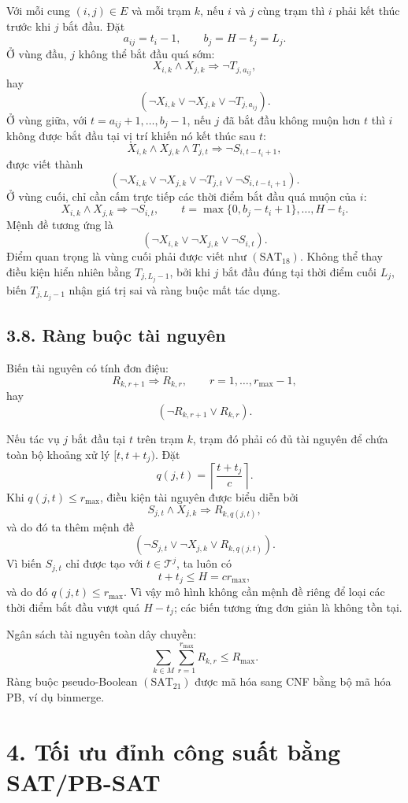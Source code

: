 \documentclass[12pt]{article}
\begin{document}
Với mỗi cung $(i,j)\in E$ và mỗi trạm $k$, nếu $i$ và $j$ cùng trạm thì $i$ phải kết thúc trước khi $j$ bắt đầu. Đặt
\[
a_{ij}=t_i-1,\qquad b_j=H-t_j=L_j.
\]
Ở vùng đầu, $j$ không thể bắt đầu quá sớm:
\[
X_{i,k}\land X_{j,k}\Rightarrow \neg T_{j,a_{ij}},
\]
hay
\[
(\neg X_{i,k}\lor \neg X_{j,k}\lor \neg T_{j,a_{ij}}).
\tag{SAT\_16}
\]
Ở vùng giữa, với $t=a_{ij}+1,\ldots,b_j-1$, nếu $j$ đã bắt đầu không muộn hơn $t$ thì $i$ không được bắt đầu tại vị trí khiến nó kết thúc sau $t$:
\[
X_{i,k}\land X_{j,k}\land T_{j,t}
\Rightarrow
\neg S_{i,t-t_i+1},
\]
được viết thành
\[
(\neg X_{i,k}\lor \neg X_{j,k}\lor \neg T_{j,t}\lor \neg S_{i,t-t_i+1}).
\tag{SAT\_17}
\]
Ở vùng cuối, chỉ cần cấm trực tiếp các thời điểm bắt đầu quá muộn của $i$:
\[
X_{i,k}\land X_{j,k}
\Rightarrow
\neg S_{i,t},
\qquad
t=\max\{0,b_j-t_i+1\},\ldots,H-t_i.
\]
Mệnh đề tương ứng là
\[
(\neg X_{i,k}\lor \neg X_{j,k}\lor \neg S_{i,t}).
\tag{SAT\_18}
\]
Điểm quan trọng là vùng cuối phải được viết như $(\mathrm{SAT}_{18})$. Không thể thay điều kiện hiển nhiên bằng $T_{j,L_j-1}$, bởi khi $j$ bắt đầu đúng tại thời điểm cuối $L_j$, biến $T_{j,L_j-1}$ nhận giá trị sai và ràng buộc mất tác dụng.

\subsection*{3.8. Ràng buộc tài nguyên}

Biến tài nguyên có tính đơn điệu:
\[
R_{k,r+1}\Rightarrow R_{k,r},
\qquad r=1,\ldots,r_{\max}-1,
\]
hay
\[
(\neg R_{k,r+1}\lor R_{k,r}).
\tag{SAT\_19}
\]

Nếu tác vụ $j$ bắt đầu tại $t$ trên trạm $k$, trạm đó phải có đủ tài nguyên để chứa toàn bộ khoảng xử lý $[t,t+t_j)$. Đặt
\[
q(j,t)=\left\lceil \frac{t+t_j}{c}\right\rceil.
\]
Khi $q(j,t)\le r_{\max}$, điều kiện tài nguyên được biểu diễn bởi
\[
S_{j,t}\land X_{j,k}\Rightarrow R_{k,q(j,t)},
\]
và do đó ta thêm mệnh đề
\[
(\neg S_{j,t}\lor \neg X_{j,k}\lor R_{k,q(j,t)}).
\tag{SAT\_20}
\]
Vì biến $S_{j,t}$ chỉ được tạo với $t\in\mathcal{T}^{j}$, ta luôn có
\[
t+t_j\le H=cr_{\max},
\]
và do đó $q(j,t)\le r_{\max}$. Vì vậy mô hình không cần mệnh đề riêng để loại các thời điểm bắt đầu vượt quá $H-t_j$; các biến tương ứng đơn giản là không tồn tại.

Ngân sách tài nguyên toàn dây chuyền:
\[
\sum_{k\in M}\sum_{r=1}^{r_{\max}}R_{k,r}\le R_{\max}.
\tag{SAT\_21}
\]
Ràng buộc pseudo-Boolean $(\mathrm{SAT}_{21})$ được mã hóa sang CNF bằng bộ mã hóa PB, ví dụ binmerge.

\section*{4. Tối ưu đỉnh công suất bằng SAT/PB-SAT}
\end{document}
